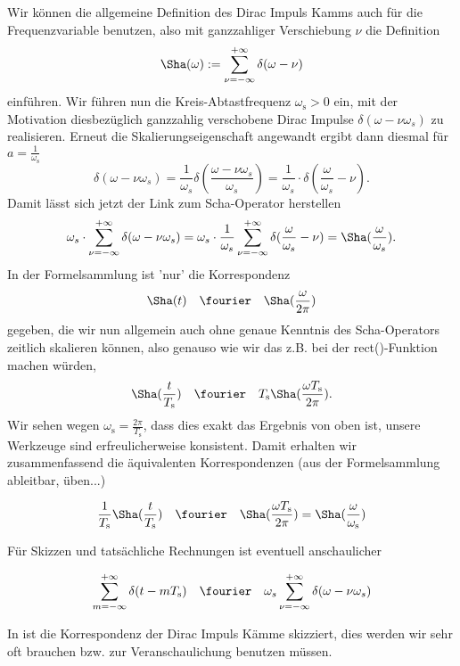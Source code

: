 Wir können die allgemeine Definition des Dirac Impuls Kamms
auch für die Frequenzvariable benutzen, also mit ganzzahliger Verschiebung $\nu$
die Definition
\begin{equation}
{\Sha}(\omega) := \sum_{\nu=-\infty}^{+\infty} \delta(\omega-\nu)
\end{equation}
einführen.
Wir führen nun die Kreis-Abtastfrequenz $\omega_\mathrm{s}>0$ ein, mit der Motivation
diesbezüglich ganzzahlig verschobene Dirac Impulse $\delta(\omega - \nu \omega_s)$
zu realisieren.
Erneut die Skalierungseigenschaft angewandt ergibt dann diesmal für
$a=\frac{1}{\omega_\mathrm{s}}$
\begin{equation}
\delta(\omega - \nu \omega_s) =
\frac{1}{\omega_s}\delta(\frac{\omega - \nu \omega_s}{\omega_s}) =
\frac{1}{\omega_s} \cdot \delta(\frac{\omega}{\omega_s}-\nu).
\end{equation}
%
Damit lässt sich jetzt der Link zum Scha-Operator herstellen
\begin{equation}
\omega_s \cdot \sum_{\nu=-\infty}^{+\infty} \delta(\omega-\nu \omega_s) =
\omega_s \cdot \frac{1}{\omega_s} \sum_{\nu=-\infty}^{+\infty} \delta(\frac{\omega}{\omega_s}-\nu) =
{\Sha}(\frac{\omega}{\omega_s}).
\end{equation}
%
In der Formelsammlung ist 'nur' die Korrespondenz
\begin{align}
  \Sha(t) \quad\fourier\quad \Sha(\frac{\omega}{2\pi})
\end{align}
gegeben, die wir nun allgemein auch ohne genaue Kenntnis des Scha-Operators zeitlich
skalieren können, also genauso wie wir das z.B. bei der rect()-Funktion machen würden,
\begin{align}
  \Sha(\frac{t}{T_\mathrm{s}}) \quad\fourier\quad
  T_\mathrm{s} \Sha(\frac{\omega T_\mathrm{s}}{2\pi}).
\end{align}
Wir sehen wegen $\omega_\mathrm{s} = \frac{2 \pi}{T_\mathrm{s}} $,
dass dies exakt das Ergebnis von oben ist, unsere Werkzeuge
sind erfreulicherweise konsistent.
%
Damit erhalten wir zusammenfassend die äquivalenten Korrespondenzen
(aus der Formelsammlung ableitbar, üben...)
\begin{mdframed}
\begin{equation}
\frac{1}{T_\mathrm{s}} {\Sha}(\frac{t}{T_\mathrm{s}}) \quad\fourier\quad
{\Sha}(\frac{\omega T_\mathrm{s}}{2 \pi}) =
\Sha(\frac{\omega}{\omega_\mathrm{s}})
\end{equation}
\end{mdframed}
Für Skizzen und tatsächliche Rechnungen ist eventuell anschaulicher
\begin{mdframed}
\begin{equation}
\sum_{m=-\infty}^{+\infty} \delta(t-m T_\mathrm{s}) \quad\fourier\quad
\omega_s \sum_{\nu=-\infty}^{+\infty} \delta(\omega-\nu \omega_s)
\end{equation}
\end{mdframed}
%
In  ist die Korrespondenz der Dirac Impuls Kämme
skizziert, dies werden wir sehr oft brauchen bzw. zur Veranschaulichung benutzen
müssen.

